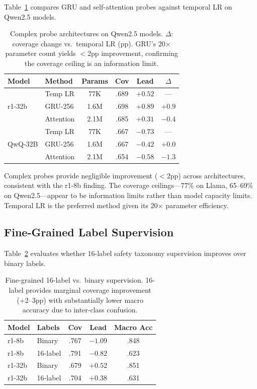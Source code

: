 \documentclass[11pt,a4paper]{article}
\begin{document}
Table~\ref{tab:complex} compares GRU and self-attention probes against temporal LR on Qwen2.5 models.

\begin{table}[t]
\centering
\small
\begin{tabular}{llcccc}
\toprule
\textbf{Model} & \textbf{Method} & \textbf{Params} & \textbf{Cov} & \textbf{Lead} & \textbf{$\Delta$} \\
\midrule
\multirow{3}{*}{r1-32b} & Temp LR & 77K & .689 & $+0.52$ & --- \\
 & GRU-256 & 1.6M & .698 & $+0.89$ & $+0.9$ \\
 & Attention & 2.1M & .685 & $+0.31$ & $-0.4$ \\
\midrule
\multirow{3}{*}{QwQ-32B} & Temp LR & 77K & .667 & $-0.73$ & --- \\
 & GRU-256 & 1.6M & .667 & $-0.42$ & $+0.0$ \\
 & Attention & 2.1M & .654 & $-0.58$ & $-1.3$ \\
\bottomrule
\end{tabular}
\caption{Complex probe architectures on Qwen2.5 models. $\Delta$: coverage change vs.\ temporal LR (pp). GRU's 20$\times$ parameter count yields $<$2pp improvement, confirming the coverage ceiling is an information limit.}
\label{tab:complex}
\end{table}

Complex probes provide negligible improvement ($<$2pp) across architectures, consistent with the r1-8b finding. The coverage ceilings---77\% on Llama, 65--69\% on Qwen2.5---appear to be information limits rather than model capacity limits. Temporal LR is the preferred method given its 20$\times$ parameter efficiency.

\subsection{Fine-Grained Label Supervision}
\label{sec:finelabel}

Table~\ref{tab:finelabel} evaluates whether 16-label safety taxonomy supervision improves over binary labels.

\begin{table}[t]
\centering
\small
\begin{tabular}{llccc}
\toprule
\textbf{Model} & \textbf{Labels} & \textbf{Cov} & \textbf{Lead} & \textbf{Macro Acc} \\
\midrule
r1-8b & Binary & .767 & $-1.09$ & .848 \\
r1-8b & 16-label & .791 & $-0.82$ & .623 \\
r1-32b & Binary & .679 & $+0.52$ & .851 \\
r1-32b & 16-label & .704 & $+0.38$ & .631 \\
\bottomrule
\end{tabular}
\caption{Fine-grained 16-label vs.\ binary supervision. 16-label provides marginal coverage improvement (+2--3pp) with substantially lower macro accuracy due to inter-class confusion.}
\label{tab:finelabel}
\end{table}
\end{document}
